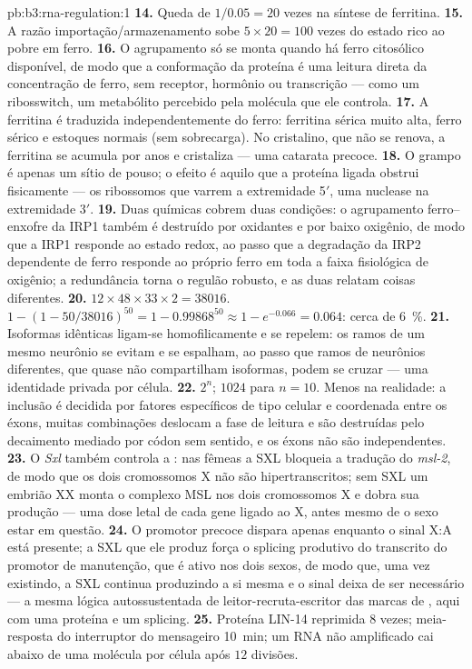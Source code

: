 \begin{solution}{pb:b3:rna-regulation:1}
\textbf{14.} Queda de $1/0.05 = 20$ vezes na síntese de ferritina.
\textbf{15.} A razão importação/armazenamento sobe $5\times 20 = 100$
vezes do estado rico ao pobre em ferro.
\textbf{16.} O agrupamento só se monta quando há ferro citosólico
disponível, de modo que a conformação da proteína é uma leitura direta da
concentração de ferro, sem receptor, hormônio ou transcrição --- como um
ribosswitch, um metabólito percebido pela molécula que ele controla.
\textbf{17.} A ferritina é traduzida independentemente do ferro: ferritina
sérica muito alta, ferro sérico e estoques normais (sem sobrecarga). No
cristalino, que não se renova, a ferritina se acumula por anos e
cristaliza --- uma catarata precoce.
\textbf{18.} O grampo é apenas um sítio de pouso; o efeito é aquilo que a
proteína ligada obstrui fisicamente --- os ribossomos que varrem a
extremidade 5$'$, uma nuclease na extremidade 3$'$.
\textbf{19.} Duas químicas cobrem duas condições: o agrupamento
ferro--enxofre da IRP1 também é destruído por oxidantes e por baixo
oxigênio, de modo que a IRP1 responde ao estado redox, ao passo que a
degradação da IRP2 dependente de ferro responde ao próprio ferro em toda
a faixa fisiológica de oxigênio; a redundância torna o regulão robusto, e
as duas relatam coisas diferentes.
\textbf{20.} $12\times 48\times 33\times 2 = \num{38016}$. $1 - (1 -
50/\num{38016})^{50} = 1 - 0.99868^{50} \approx 1 - e^{-0.066} =
0.064$: cerca de \qty{6}{\%}.
\textbf{21.} Isoformas idênticas ligam-se homofilicamente e se repelem: os
ramos de um mesmo neurônio se evitam e se espalham, ao passo que ramos de
neurônios diferentes, que quase não compartilham isoformas, podem se
cruzar --- uma identidade privada por célula.
\textbf{22.} $2^{n}$; $\num{1024}$ para $n = 10$. Menos na realidade: a
inclusão é decidida por fatores específicos de tipo celular e coordenada
entre os éxons, muitas combinações deslocam a fase de leitura e são
destruídas pelo decaimento mediado por códon sem sentido, e os éxons não
são independentes.
\textbf{23.} O \emph{Sxl} também controla a : nas
fêmeas a SXL bloqueia a tradução do \emph{msl-2}, de modo que os dois
cromossomos X não são hipertranscritos; sem SXL um embrião XX monta o
complexo MSL nos dois cromossomos X e dobra sua produção --- uma dose
letal de cada gene ligado ao X, antes mesmo de o sexo estar em questão.
\textbf{24.} O promotor precoce dispara apenas enquanto o sinal X:A está
presente; a SXL que ele produz força o splicing produtivo do transcrito
do promotor de manutenção, que é ativo nos dois sexos, de modo que, uma
vez existindo, a SXL continua produzindo a si mesma e o sinal deixa de ser
necessário --- a mesma lógica autossustentada de leitor-recruta-escritor
das marcas de , aqui com uma proteína e um splicing.
\textbf{25.} Proteína LIN-14 reprimida $8$ vezes; meia-resposta do
interruptor do mensageiro \qty{10}{min}; um RNA não amplificado cai abaixo
de uma molécula por célula após $12$ divisões.
\end{solution}
